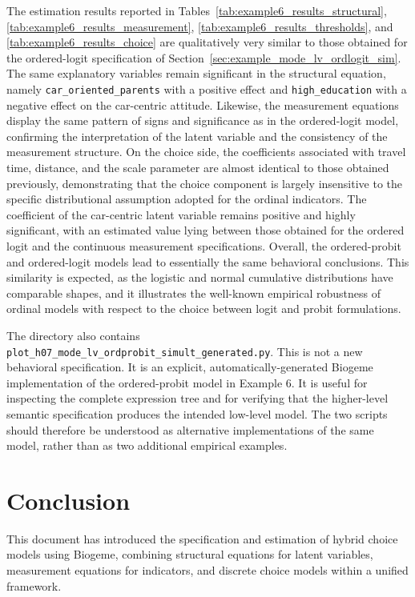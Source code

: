 \documentclass[12pt,a4paper]{article}
\let\OrigUnderscore\_
\def\_{\OrigUnderscore\penalty0\hspace{0pt}}%
\begin{document}
The estimation results reported in
Tables~\ref{tab:example6_results_structural},
\ref{tab:example6_results_measurement},
\ref{tab:example6_results_thresholds}, and
\ref{tab:example6_results_choice} are qualitatively very similar to
those obtained for the ordered-logit specification of
Section~\ref{sec:example_mode_lv_ordlogit_sim}. The same explanatory
variables remain significant in the structural equation, namely
\texttt{car\_oriented\_parents} with a positive effect and
\texttt{high\_education} with a negative effect on the car-centric
attitude. Likewise, the measurement equations display the same pattern
of signs and significance as in the ordered-logit model, confirming
the interpretation of the latent variable and the consistency of the
measurement structure. On the choice side, the coefficients associated
with travel time, distance, and the scale parameter are almost
identical to those obtained previously, demonstrating that the choice
component is largely insensitive to the specific distributional
assumption adopted for the ordinal indicators. The coefficient of the
car-centric latent variable remains positive and highly significant,
with an estimated value lying between those obtained for the ordered
logit and the continuous measurement specifications. Overall, the
ordered-probit and ordered-logit models lead to essentially the same
behavioral conclusions. This similarity is expected, as the logistic
and normal cumulative distributions have comparable shapes, and it
illustrates the well-known empirical robustness of ordinal models with
respect to the choice between logit and probit formulations.

The directory also contains
\texttt{plot\_h07\_mode\_lv\_ordprobit\_simult\_generated.py}. This is
not a new behavioral specification. It is an explicit,
automatically-generated Biogeme implementation of the ordered-probit
model in Example 6. It is useful for inspecting the complete
expression tree and for verifying that the higher-level semantic
specification produces the intended low-level model. The two scripts
should therefore be understood as alternative implementations of the
same model, rather than as two additional empirical examples.

\FloatBarrier

\section{Conclusion}

This document has introduced the specification and estimation of
hybrid choice models using Biogeme, combining structural equations for
latent variables, measurement equations for indicators, and discrete
choice models within a unified framework.
\end{document}
